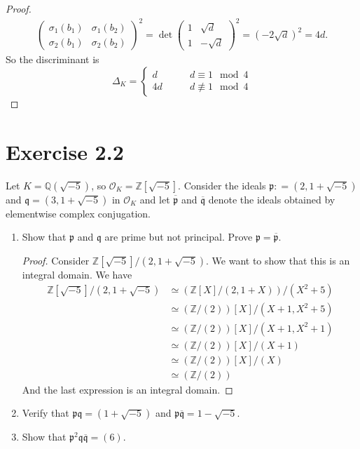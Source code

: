\documentclass[a4paper]{article}
\begin{document}
\begin{enumerate}
\begin{proof}
\begin{align*}
\begin{pmatrix}
        \sigma_1(b_1) & \sigma_1(b_2) \\
        \sigma_2(b_1) & \sigma_2(b_2)
      \end{pmatrix}^2
      = \det \begin{pmatrix}
        1 & \sqrt{d} \\
        1 & -\sqrt{d}
      \end{pmatrix}^2
      = (-2\sqrt{d})^2 = 4d \text{.}
    \end{align*}
    So the discriminant is
    \begin{equation}
      \Delta_K = \begin{cases}
        d & \qquad d \equiv 1 \mod{4}\\
        4d & \qquad d \not\equiv 1 \mod{4}
      \end{cases}
    \end{equation}
  \end{proof}
\end{enumerate}
\section*{Exercise 2.2}
Let \(K = \mathbb{Q}(\sqrt{-5})\), so \(\mathcal{O}_K = \mathbb{Z}[\sqrt{-5}]\). Consider the ideals \(\mathfrak{p}: = (2, 1 + \sqrt{-5})\) and \(\mathfrak{q} = (3, 1 + \sqrt{-5})\) in \(\mathcal{O}_K\) and let \(\overline{\mathfrak{p}}\) and \(\overline{\mathfrak{q}}\) denote the ideals obtained by elementwise complex conjugation.
\begin{enumerate}
  \item Show that \(\mathfrak{p}\) and \(\mathfrak{q}\) are prime but not principal. Prove \(\mathfrak{p} = \overline{\mathfrak{p}}\).
  \begin{proof}
    Consider \(\mathbb{Z}[\sqrt{-5}] / (2, 1 + \sqrt{-5})\). We want to show that this is an integral domain. We have
    \begin{align*}
      \mathbb{Z}[\sqrt{-5}] / (2, 1 + \sqrt{-5}) &\simeq (\mathbb{Z}[X] / (2, 1 + X)) / (X^2 + 5) \\
      & \simeq (\mathbb{Z} / (2)) [X] / (X + 1, X^2 + 5) \\
      & \simeq (\mathbb{Z} / (2)) [X] / (X + 1, X^2 + 1) \\
      & \simeq (\mathbb{Z} / (2)) [X] / (X + 1) \\
      & \simeq (\mathbb{Z} / (2)) [X] / (X) \\
      & \simeq (\mathbb{Z} / (2))
    \end{align*}
    And the last expression is an integral domain.
  \end{proof}
  \item Verify that \(\mathfrak{p}\mathfrak{q} = (1 + \sqrt{-5})\) and \(\mathfrak{p}\overline{\mathfrak{q}} = 1 - \sqrt{-5}\).
  \item Show that \(\mathfrak{p}^2 \mathfrak{q}\overline{\mathfrak{q}} = (6)\).
\end{enumerate}
\end{document}
